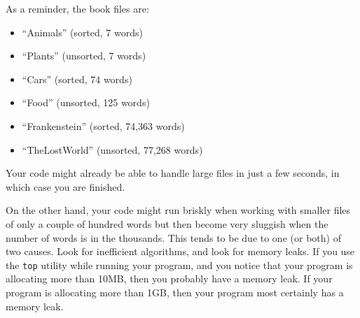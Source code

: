 \begin{description}
\end{description}

As a reminder, the book files are:

\begin{itemize}
    \item ``Animals'' (sorted, 7 words)
    \item ``Plants'' (unsorted, 7 words)
    \item ``Cars'' (sorted, 74 words)
    \item ``Food'' (unsorted, 125 words)
    \item ``Frankenstein'' (sorted, 74,363 words)
    \item ``TheLostWorld'' (unsorted, 77,268 words)
\end{itemize}

Your code might already be able to handle large files in just a few seconds, in which case you are finished.

On the other hand, your code might run briskly when working with smaller files of only a couple of hundred words but then become very sluggish when the number of words is in the thousands.
This tends to be due to one (or both) of two causes.
Look for inefficient algorithms, and look for memory leaks.
If you use the \texttt{top} utility while running your program, and you notice that your program is allocating more than 10MB, then you probably have a memory leak.
If your program is allocating more than 1GB, then your program most certainly has a memory leak.
